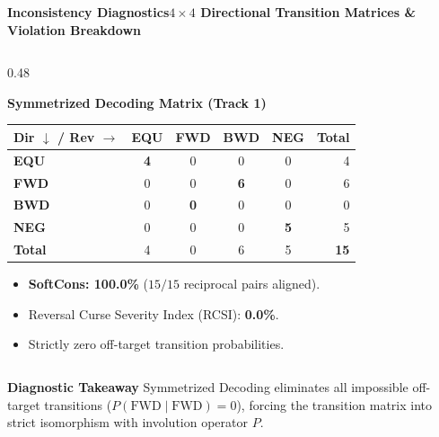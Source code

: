 \documentclass[aspectratio=169,10pt]{beamer}
\begin{document}
\begin{frame}{\textbf{Inconsistency Diagnostics}}{\textbf{$4 \times 4$ Directional Transition Matrices \& Violation Breakdown}}
\begin{columns}[T]
    \begin{column}{0.48\textwidth}
      \begin{exampleblock}{\textbf{Symmetrized Decoding Matrix (Track 1)}}
        \centering
        \footnotesize
        \vspace{0.1cm}
        \begin{tabular}{l|cccc|r}
          \toprule
          \textbf{Dir $\downarrow$ / Rev $\rightarrow$} & \textbf{EQU} & \textbf{FWD} & \textbf{BWD} & \textbf{NEG} & \textbf{Total} \\
          \midrule
          \textbf{EQU} & \textbf{4} & 0 & 0 & 0 & 4 \\
          \textbf{FWD} & 0 & 0 & \textbf{6} & 0 & 6 \\
          \textbf{BWD} & 0 & \textbf{0} & 0 & 0 & 0 \\
          \textbf{NEG} & 0 & 0 & 0 & \textbf{5} & 5 \\
          \midrule
          \textbf{Total} & 4 & 0 & 6 & 5 & \textbf{15} \\
          \bottomrule
        \end{tabular}
        \vspace{0.1cm}
        \begin{itemize}
          \item \textbf{SoftCons: 100.0\%} ($15/15$ reciprocal pairs aligned).
          \item Reversal Curse Severity Index (RCSI): \textbf{0.0\%}.
          \item Strictly zero off-target transition probabilities.
        \end{itemize}
      \end{exampleblock}
    \end{column}
  \end{columns}
  \vspace{0.15cm}
  \begin{alertblock}{\textbf{Diagnostic Takeaway}}
    \small
    Symmetrized Decoding eliminates all impossible off-target transitions ($P(\text{FWD} \mid \text{FWD}) = 0$), forcing the transition matrix into strict isomorphism with involution operator $P$.
  \end{alertblock}
\end{frame}
\end{document}
